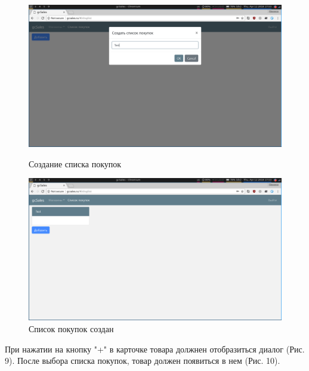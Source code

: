 \begin{figure}[H]
    \centering
    \includegraphics[width=\textwidth]{./screenshots/create_shoplist.png}
    \caption{Создание списка покупок}
    \endminipage\hfill
    \includegraphics[width=\textwidth]{./screenshots/new_shoplist.png}
    \caption{Список покупок создан}
    \endminipage
\end{figure}

При нажатии на кнопку "+" в карточке товара должнен отобразиться диалог (Рис.
9). После выбора списка покупок, товар должен появиться в нем (Рис. 10).

